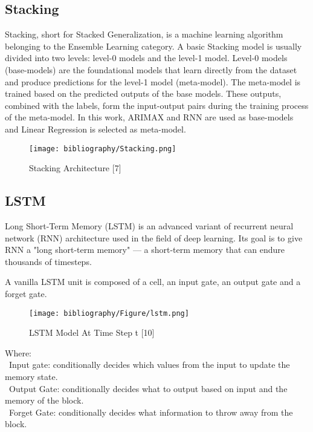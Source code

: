 \documentclass{ieeeojies}
\begin{document}
\subsection{Stacking}

Stacking, short for Stacked Generalization, is a machine learning algorithm belonging to the Ensemble Learning category. A basic Stacking model is usually divided into two levels: level-0 models and the level-1 model. Level-0 models (base-models) are the foundational models that learn directly from the dataset and produce predictions for the level-1 model (meta-model). The meta-model is trained based on the predicted outputs of the base models. These outputs, combined with the labels, form the input-output pairs during the training process of the meta-model. In this work, ARIMAX and RNN are used as base-models and Linear Regression is selected as meta-model.  
\begin{figure}[H]
  \centering
  \begin{minipage}{0.9\linewidth}
    \centering
    \texttt{[image: bibliography/Stacking.png]}
    \caption{Stacking Architecture [7]}
    \label{fig8}
  \end{minipage}
\end{figure}




\subsection{LSTM}
Long Short-Term Memory (LSTM) is an advanced variant of recurrent neural network (RNN) architecture used in the field of deep learning. Its goal is to give RNN a "long short-term memory" — a short-term memory that can endure thousands of timesteps.

A vanilla LSTM unit is composed of a cell, an input gate, an output gate and a forget gate.

\begin{figure}[H]
  \centering
  \begin{minipage}{0.8\linewidth}
    \centering
    \texttt{[image: bibliography/Figure/lstm.png]}
    \caption{LSTM Model At Time Step t [10]}
    \label{fig9}
  \end{minipage}
\end{figure}

Where:\\
\indent\textbullet\ Input gate: conditionally decides which values from the input to update the memory state.\\
\indent\textbullet\ Output Gate: conditionally decides what to output based on input and the memory of the block.\\
\indent\textbullet\ Forget Gate: conditionally decides what information to throw away from the block.\\
\end{document}
